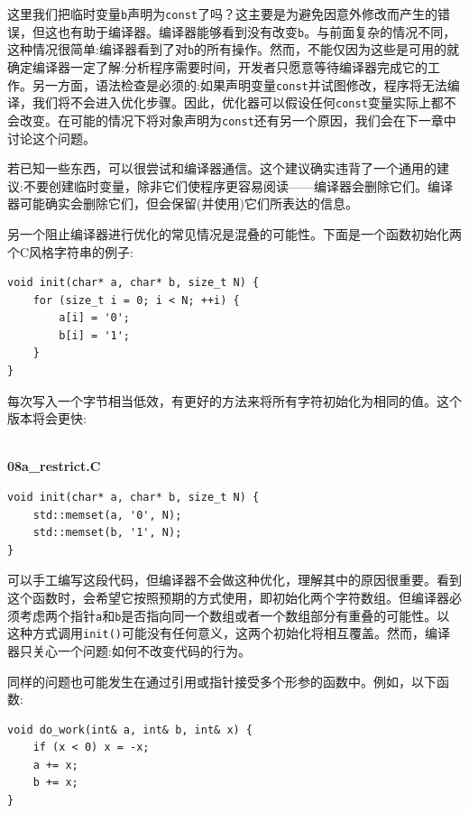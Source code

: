 这里我们把临时变量\texttt{b}声明为\texttt{const}了吗？这主要是为避免因意外修改而产生的错误，但这也有助于编译器。编译器能够看到没有改变\texttt{b}。与前面复杂的情况不同，这种情况很简单:编译器看到了对\texttt{b}的所有操作。然而，不能仅因为这些是可用的就确定编译器一定了解:分析程序需要时间，开发者只愿意等待编译器完成它的工作。另一方面，语法检查是必须的:如果声明变量\texttt{const}并试图修改，程序将无法编译，我们将不会进入优化步骤。因此，优化器可以假设任何\texttt{const}变量实际上都不会改变。在可能的情况下将对象声明为\texttt{const}还有另一个原因，我们会在下一章中讨论这个问题。 

若已知一些东西，可以很尝试和编译器通信。这个建议确实违背了一个通用的建议:不要创建临时变量，除非它们使程序更容易阅读——编译器会删除它们。编译器可能确实会删除它们，但会保留(并使用)它们所表达的信息。

另一个阻止编译器进行优化的常见情况是混叠的可能性。下面是一个函数初始化两个C风格字符串的例子:

\begin{lstlisting}[style=styleCXX]
void init(char* a, char* b, size_t N) {
	for (size_t i = 0; i < N; ++i) {
		a[i] = '0';
		b[i] = '1';
	}
}

\end{lstlisting}

每次写入一个字节相当低效，有更好的方法来将所有字符初始化为相同的值。这个版本将会更快:

\hspace*{\fill} \\ %
\noindent
\textbf{08a\_restrict.C}
\begin{lstlisting}[style=styleCXX]
void init(char* a, char* b, size_t N) {
	std::memset(a, '0', N);
	std::memset(b, '1', N);
}
\end{lstlisting}

可以手工编写这段代码，但编译器不会做这种优化，理解其中的原因很重要。看到这个函数时，会希望它按照预期的方式使用，即初始化两个字符数组。但编译器必须考虑两个指针\texttt{a}和\texttt{b}是否指向同一个数组或者一个数组部分有重叠的可能性。以这种方式调用\texttt{init()}可能没有任何意义，这两个初始化将相互覆盖。然而，编译器只关心一个问题:如何不改变代码的行为。 

同样的问题也可能发生在通过引用或指针接受多个形参的函数中。例如，以下函数:

\begin{lstlisting}[style=styleCXX]
void do_work(int& a, int& b, int& x) {
	if (x < 0) x = -x;
	a += x;
	b += x;
}
\end{lstlisting}

